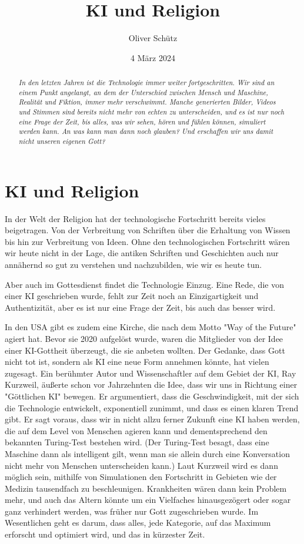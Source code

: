 \documentclass[10pt]{article}
\title{KI und Religion}
\author{Oliver Schütz}
\date{4 März 2024}
\begin{document}
\overfullrule=0pt

\maketitle
\begin{abstract}
  \noindent\textit
  {In den letzten Jahren ist die Technologie immer weiter fortgeschritten.
   Wir sind an einem Punkt angelangt, an dem der Unterschied zwischen Mensch und Maschine, Realität und Fiktion, immer mehr verschwimmt.
   Manche generierten Bilder, Videos und Stimmen sind bereits nicht mehr von echten zu unterscheiden, und es ist nur noch eine Frage der Zeit, bis alles, was wir sehen, hören und fühlen können, simuliert werden kann.
   An was kann man dann noch glauben? Und erschaffen wir uns damit nicht unseren eigenen Gott?}
\end{abstract}

\tableofcontents
\newpage
\section{KI und Religion}
In der Welt der Religion hat der technologische Fortschritt bereits vieles beigetragen. Von der Verbreitung von Schriften über die Erhaltung von Wissen bis hin zur Verbreitung von Ideen. Ohne den technologischen Fortschritt wären wir heute nicht in der Lage, die antiken Schriften und Geschichten auch nur annähernd so gut zu verstehen und nachzubilden, wie wir es heute tun.

Aber auch im Gottesdienst findet die Technologie Einzug. Eine Rede, die von einer KI geschrieben wurde, fehlt zur Zeit noch an Einzigartigkeit und Authentizität, aber es ist nur eine Frage der Zeit, bis auch das besser wird.

In den USA gibt es zudem eine Kirche, die nach dem Motto "Way of the Future" agiert hat. Bevor sie 2020 aufgelöst wurde, waren die Mitglieder von der Idee einer KI-Gottheit überzeugt, die sie anbeten wollten. Der Gedanke, dass Gott nicht tot ist, sondern als KI eine neue Form annehmen könnte, hat vielen zugesagt.
\cite{BR}
Ein berühmter Autor und Wissenschaftler auf dem Gebiet der KI, Ray Kurzweil, äußerte schon vor Jahrzehnten die Idee, dass wir uns in Richtung einer "Göttlichen KI" bewegen. Er argumentiert, dass die Geschwindigkeit, mit der sich die Technologie entwickelt, exponentiell zunimmt, und dass es einen klaren Trend gibt. Er sagt voraus, dass wir in nicht allzu ferner Zukunft eine KI haben werden, die auf dem Level von Menschen agieren kann und dementsprechend den bekannten Turing-Test bestehen wird. (Der Turing-Test besagt, dass eine Maschine dann als intelligent gilt, wenn man sie allein durch eine Konversation nicht mehr von Menschen unterscheiden kann.) Laut Kurzweil wird es dann möglich sein, mithilfe von Simulationen den Fortschritt in Gebieten wie der Medizin tausendfach zu beschleunigen. Krankheiten wären dann kein Problem mehr, und auch das Altern könnte um ein Vielfaches hinausgezögert oder sogar ganz verhindert werden, was früher nur Gott zugeschrieben wurde. Im Wesentlichen geht es darum, dass alles, jede Kategorie, auf das Maximum erforscht und optimiert wird, und das in kürzester Zeit.
\cite{Kurzweil}
\end{document}
